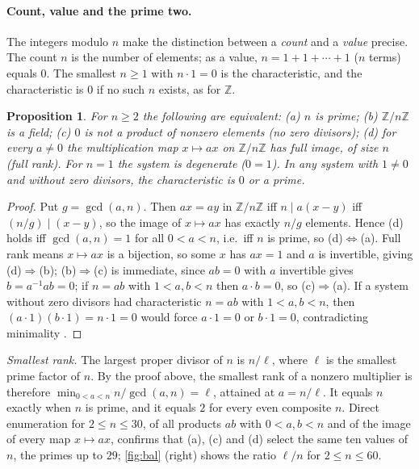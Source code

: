 \documentclass[11pt]{article}
\newtheorem{proposition}[theorem]{Proposition}
\theoremstyle{definition}\newtheorem{definition}[theorem]{Definition}
\theoremstyle{remark}\newtheorem{remark}[theorem]{Remark}
\begin{document}
\paragraph{Count, value and the prime two.} The integers modulo $n$ make the distinction between a \emph{count} and a \emph{value} precise. The count $n$ is the number of elements; as a value, $n=1+1+\cdots+1$ ($n$ terms) equals $0$. The smallest $n\ge1$ with $n\cdot1=0$ is the characteristic, and the characteristic is $0$ if no such $n$ exists, as for $\mathbb Z$.

\begin{proposition}\label{prop:field}
For $n\ge2$ the following are equivalent: (a) $n$ is prime; (b) $\mathbb Z/n\mathbb Z$ is a field; (c) $0$ is not a product of nonzero elements (no zero divisors); (d) for every $a\ne0$ the multiplication map $x\mapsto ax$ on $\mathbb Z/n\mathbb Z$ has full image, of size $n$ (full rank). For $n=1$ the system is degenerate ($0=1$). In any system with $1\ne0$ and without zero divisors, the characteristic is $0$ or a prime.
\end{proposition}
\begin{proof}
Put $g=\gcd(a,n)$. Then $ax=ay$ in $\mathbb Z/n\mathbb Z$ iff $n\mid a(x-y)$ iff $(n/g)\mid(x-y)$, so the image of $x\mapsto ax$ has exactly $n/g$ elements. Hence (d) holds iff $\gcd(a,n)=1$ for all $0<a<n$, i.e.\ iff $n$ is prime, so (d)$\Leftrightarrow$(a). Full rank means $x\mapsto ax$ is a bijection, so some $x$ has $ax=1$ and $a$ is invertible, giving (d)$\Rightarrow$(b); (b)$\Rightarrow$(c) is immediate, since $ab=0$ with $a$ invertible gives $b=a^{-1}ab=0$; if $n=ab$ with $1<a,b<n$ then $a\cdot b=0$, so (c)$\Rightarrow$(a). If a system without zero divisors had characteristic $n=ab$ with $1<a,b<n$, then $(a\cdot1)(b\cdot1)=n\cdot1=0$ would force $a\cdot1=0$ or $b\cdot1=0$, contradicting minimality \cite{Lang}.
\end{proof}
\noindent\emph{Smallest rank.} The largest proper divisor of $n$ is $n/\ell$, where $\ell$ is the smallest prime factor of $n$. By the proof above, the smallest rank of a nonzero multiplier is therefore $\min_{0<a<n}n/\gcd(a,n)=\ell$, attained at $a=n/\ell$. It equals $n$ exactly when $n$ is prime, and it equals $2$ for every even composite $n$. Direct enumeration for $2\le n\le30$, of all products $ab$ with $0<a,b<n$ and of the image of every map $x\mapsto ax$, confirms that (a), (c) and (d) select the same ten values of $n$, the primes up to $29$; \cref{fig:bal} (right) shows the ratio $\ell/n$ for $2\le n\le60$.
\end{document}

